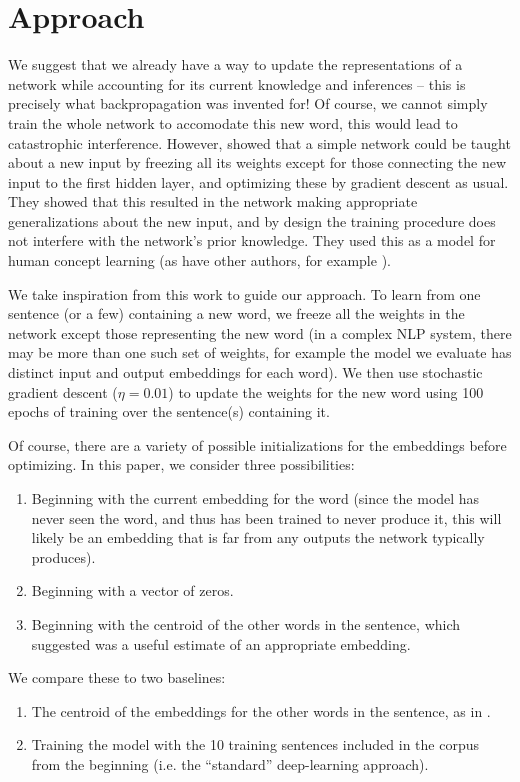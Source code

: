 \documentclass{article}
\begin{document}
\section{Approach}
We suggest that we already have a way to update the representations of a network while accounting for its current knowledge and inferences -- this is precisely what backpropagation was invented for! Of course, we cannot simply train the whole network to accomodate this new word, this would lead to catastrophic interference. However, \citet{Rumelhart1993} showed that a simple network could be taught about a new input by freezing all its weights except for those connecting the new input to the first hidden layer, and optimizing these by gradient descent as usual. They showed that this resulted in the network making appropriate generalizations about the new input, and by design the training procedure does not interfere with the network's prior knowledge. They used this as a model for human concept learning (as have other authors, for example \citet{Rogers2004}). \par
We take inspiration from this work to guide our approach. To learn from one sentence (or a few) containing a new word, we freeze all the weights in the network except those representing the new word (in a complex NLP system, there may be more than one such set of weights, for example the model we evaluate has distinct input and output embeddings for each word). We then use stochastic gradient descent (\(\eta = 0.01\)) to update the weights for the new word using 100 epochs of training over the sentence(s) containing it. \par
Of course, there are a variety of possible initializations for the embeddings before optimizing. In this paper, we consider three possibilities: 
\vspace{-0.5em}
\begin{enumerate}
\setlength\itemsep{0em}
\item Beginning with the current embedding for the word (since the model has never seen the word, and thus has been trained to never produce it, this will likely be an embedding that is far from any outputs the network typically produces).
\item Beginning with a vector of zeros.
\item Beginning with the centroid of the other words in the sentence, which \citet{Lazaridou2017} suggested was a useful estimate of an appropriate embedding.
\end{enumerate}
\vspace{-0.5em}
We compare these to two baselines:
\vspace{-0.5em}
\begin{enumerate}
\setlength\itemsep{0em}
\item The centroid of the embeddings for the other words in the sentence, as in \citet{Lazaridou2017}. 
\item Training the model with the 10 training sentences included in the corpus from the beginning (i.e. the ``standard'' deep-learning approach).
\end{enumerate}
\end{document}
